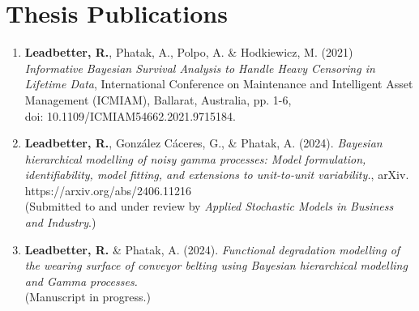 
\chapter*{Thesis Publications} 

\begin{enumerate}
  \item \textbf{Leadbetter, R.}, Phatak, A., Polpo, A. \& Hodkiewicz, M. (2021) \textit{Informative Bayesian Survival Analysis to Handle Heavy Censoring in Lifetime Data}, International Conference on Maintenance and Intelligent Asset Management (ICMIAM), Ballarat, Australia, pp. 1-6,\\ doi: 10.1109/ICMIAM54662.2021.9715184.
  \item \textbf{Leadbetter, R.}, Gonz\'{a}lez C\'{a}ceres, G., \& Phatak, A. (2024). \textit{Bayesian hierarchical modelling of noisy gamma processes: Model formulation, identifiability, model fitting, and extensions to unit-to-unit variability.}, arXiv. https://arxiv.org/abs/2406.11216 \\
  (Submitted to and under review by \textit{Applied Stochastic Models in Business and Industry}.)
  \item \textbf{Leadbetter, R.} \& Phatak, A. (2024). \textit{Functional degradation modelling of the wearing surface of conveyor belting using Bayesian hierarchical modelling and Gamma processes.} \\
  (Manuscript in progress.)
\end{enumerate}